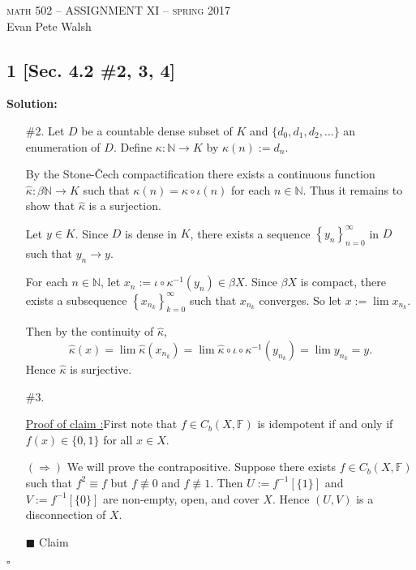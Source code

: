 \documentclass[12pt]{article}
\newcounter{ProofCounter}
\newcounter{ClaimCounter}[ProofCounter]
\newenvironment{Solution}{\stepcounter{ProofCounter}\textbf{Solution:}}{\hfill$\square$}
\newenvironment{claim}[1]{\vspace{1mm}\stepcounter{ClaimCounter}\par\noindent\underline{\bf Claim \theClaimCounter:}\space#1}{}
\newenvironment{claimproof}[1]{\par\noindent\underline{Proof of claim \theClaimCounter:}\space#1}{\hfill $\blacksquare$ Claim \theClaimCounter}
\begin{document}
\thispagestyle{empty}
\begin{center}
  \Large \textsc{math 502 -- ASSIGNMENT XI -- spring 2017} \\ 
  \vspace{5mm}
  \large Evan Pete Walsh
\end{center}


\subsection*{1 [Sec. 4.2 \#2, 3, 4]}
\begin{Solution}
  \begin{enumerate}
    \item[\#2.] Let $D$ be a countable dense subset of $K$ and $\{d_0, d_1, d_2, \dots\}$ an enumeration of $D$. Define $\kappa : \mathbb{N}
      \rightarrow K$ by $\kappa(n) := d_{n}$.

      By the Stone-\v{C}ech compactification there exists a continuous function $\hat{\kappa} : \beta \mathbb{N} \rightarrow K$ such that $\kappa(n) =
      \hat{\kappa}\circ \iota(n)$ for each $n \in \mathbb{N}$. Thus it remains to show that $\hat{\kappa}$ is a surjection.

      Let $y \in K$. Since $D$ is dense in $K$, there exists a sequence $\left\{ y_n \right\}_{n=0}^{\infty}$ in $D$ such that $y_n \rightarrow y$.

      For each $n \in \mathbb{N}$, let $x_n := \iota \circ \kappa^{-1}(y_n) \in \beta X$. Since $\beta X$ is compact, there exists a subsequence $\left\{
      x_{n_k} \right\}_{k=0}^{\infty}$ such that $x_{n_k}$ converges. So let $x := \lim x_{n_k}$.

      Then by the continuity of $\hat{\kappa}$,
      \[
        \hat{\kappa}(x) = \lim \hat{\kappa}(x_{n_k}) = \lim \hat{\kappa} \circ \iota \circ \kappa^{-1}(y_{n_k}) = \lim y_{n_k} = y.
      \]
      Hence $\hat{\kappa}$ is surjective.

    \item[\#3.]
      \begin{claimproof}
        First note that $f \in C_b(X, \mathbb{F})$ is idempotent if and only if $f(x) \in \{0,1\}$ for all $x \in X$.

        $(\Rightarrow)$ We will prove the contrapositive. Suppose there exists $f \in C_b(X, \mathbb{F})$ such that $f^2 \equiv f$ but $f \not\equiv
        0$ and $f \not\equiv 1$. Then $U := f^{-1}[\{1\}]$ and $V := f^{-1}[\{0\}]$ are non-empty, open, and cover $X$. Hence $(U, V)$ is a disconnection of $X$.


\end{claimproof}
\end{enumerate}
\end{Solution}
\end{document}
